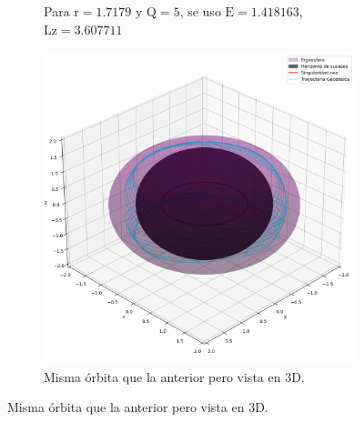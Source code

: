 \begin{figure}[H]
\begin{subfigure}{0.4\textwidth}
        \caption{Para $\mathrm{r}=1.7179$ y $\mathrm{Q}=5$, se uso $\mathrm{E}=1.418163$, $\mathrm{Lz}=3.607711$}
    \end{subfigure}
    \begin{subfigure}{0.4\textwidth}
        \includegraphics[width=\linewidth]{AgujerosNegros/kerr/geodesics_plots/geodesica_circular_r1,71_Q5.png}
        \caption{Misma órbita que la anterior pero vista en 3D.}
    \end{subfigure}


\end{figure}
